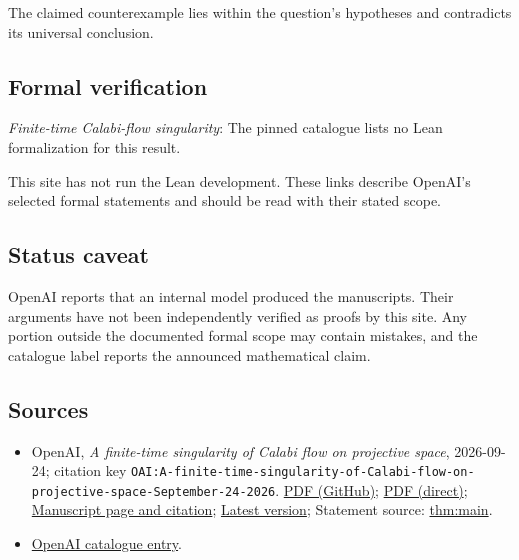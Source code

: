 \documentclass[11pt]{article}
\begin{document}
The claimed counterexample lies within the question’s hypotheses and contradicts its universal conclusion.

\subsection{Formal verification}
\textit{Finite-time Calabi-flow singularity}: The pinned catalogue lists no Lean formalization for this result.

This site has not run the Lean development. These links describe OpenAI’s selected formal statements and should be read with their stated scope.

\subsection{Status caveat}
OpenAI reports that an internal model produced the manuscripts. Their arguments have not been independently verified as proofs by this site. Any portion outside the documented formal scope may contain mistakes, and the catalogue label reports the announced mathematical claim.

\subsection{Sources}
\begin{itemize}
\item OpenAI, \emph{A finite-time singularity of Calabi flow on projective space}, 2026-09-24; citation key \texttt{OAI:A-finite-time-singularity-of-Calabi-flow-on-projective-space-September-24-2026}. \href{https://github.com/openai/math/blob/adc7f1241b42e322a6451854ab7e4b4c146bf78a/preprints/A-finite-time-singularity-of-Calabi-flow-on-projective-space-September-24-2026/paper.pdf}{PDF (GitHub)}; \href{https://github.com/openai/math/raw/adc7f1241b42e322a6451854ab7e4b4c146bf78a/preprints/A-finite-time-singularity-of-Calabi-flow-on-projective-space-September-24-2026/paper.pdf}{PDF (direct)}; \href{https://github.com/openai/math/blob/adc7f1241b42e322a6451854ab7e4b4c146bf78a/preprints/A-finite-time-singularity-of-Calabi-flow-on-projective-space-September-24-2026/README.md}{Manuscript page and citation}; \href{https://github.com/openai/math/blob/main/preprints/A-finite-time-singularity-of-Calabi-flow-on-projective-space-September-24-2026/paper.pdf}{Latest version}; Statement source: \href{https://github.com/openai/math/blob/adc7f1241b42e322a6451854ab7e4b4c146bf78a/preprints/A-finite-time-singularity-of-Calabi-flow-on-projective-space-September-24-2026/build/sections/introduction.tex\#L20}{thm:main}.
\item \href{https://github.com/openai/math/blob/adc7f1241b42e322a6451854ab7e4b4c146bf78a/CONTENTS.md}{OpenAI catalogue entry}.
\end{itemize}
\end{document}

